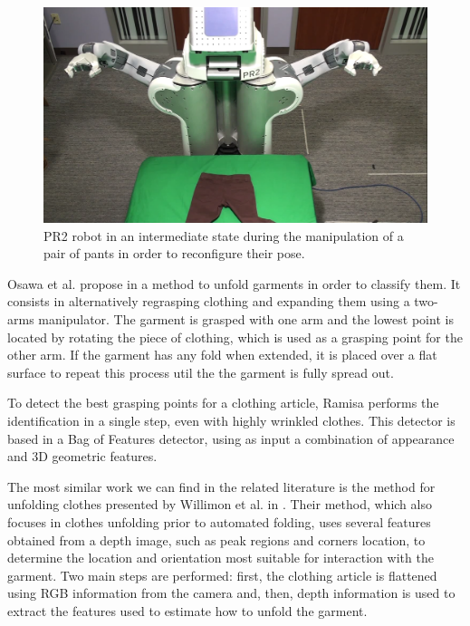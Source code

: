 \begin{figure}[thpb]
    \centering
    \includegraphics[width=\textwidth]{figures/SOTA_Cusumano_PR2.png}
    \caption[PR2 robot during the manipulation of a pair of pants in order to reconfigure their pose.]
    {PR2 robot in an intermediate state during the manipulation of a pair of pants in order to reconfigure their pose.}
    \label{fig:SOTA_Cusumano_2011}
\end{figure}

Osawa et al. propose in \cite{Osawa2006} a method to unfold garments in order to classify them. It consists in alternatively regrasping clothing and expanding them using a two-arms manipulator. The garment is grasped with one arm and the lowest point is located by rotating the piece of clothing, which is used as a grasping point for the other arm. If the garment has any fold when extended, it is placed over a flat surface to repeat this process util the the garment is fully spread out.

To detect the best grasping points for a clothing article, Ramisa \cite{Ramisa2012} performs the identification in a single step, even with highly wrinkled clothes. This detector is based in a Bag of Features detector, using as input a combination of appearance and 3D geometric features.

The most similar work we can find in the related literature is the method for unfolding clothes presented by Willimon et al. in \cite{Willimon2011}. Their method, which also focuses in clothes unfolding prior to automated folding, uses several features obtained from a depth image, such as peak regions and corners location, to determine the location and orientation most suitable for interaction with the garment. Two main steps are performed: first, the clothing article is flattened using RGB information from the camera and, then, depth information is used to extract the features used to estimate how to unfold the garment.

